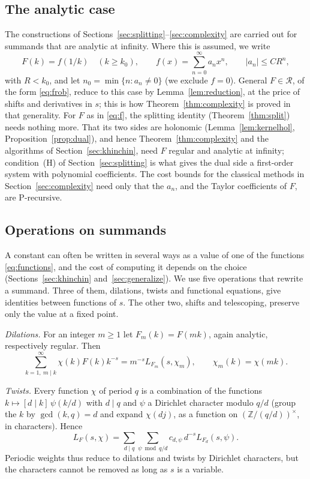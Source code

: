 \documentclass[11pt,reqno]{amsart}
\theoremstyle{definition}
\theoremstyle{remark}
\newcommand{\Reg}{\mathcal{R}}
\newcommand{\ZZ}{\mathbb{Z}}
\begin{document}
\subsection{The analytic case}\label{sec:scope}
The constructions of Sections~\ref{sec:splitting}--\ref{sec:complexity} are carried out for summands that are
analytic at infinity. Where this is assumed, we write
\begin{equation}\label{eq:f}
  F(k) = f(1/k) \quad (k \ge k_0), \qquad f(x) = \sum_{n=0}^{\infty}a_nx^n, \qquad |a_n| \le C R^n,
\end{equation}
with $R < k_0$, and let $n_0 = \min\{n : a_n \ne 0\}$ (we exclude $f = 0$). General $F \in \Reg$, of the form \eqref{eq:frob},
reduce to this case by Lemma~\ref{lem:reduction}, at the price of shifts and derivatives in $s$; this is how
Theorem~\ref{thm:complexity} is proved in that generality. For $F$ as in \eqref{eq:f}, the splitting identity
(Theorem~\ref{thm:split}) needs nothing more. That its two sides are holonomic (Lemma~\ref{lem:kernelhol}, Proposition~\ref{prop:dual}), and hence
Theorem~\ref{thm:complexity} and the algorithms of Section~\ref{sec:khinchin}, need $F$ regular and analytic at
infinity; condition~(H) of Section~\ref{sec:splitting} is what gives the dual side a first-order system with
polynomial coefficients. The cost bounds for the classical methods in Section~\ref{sec:complexity} need only that
the $a_n$, and the Taylor coefficients of $F$, are P-recursive.

\subsection{Operations on summands}\label{sec:twists}
A constant can often be written in several ways as a value of one of the functions \eqref{eq:functions}, and the
cost of computing it depends on the choice (Sections~\ref{sec:khinchin} and~\ref{sec:generalize}). We use five
operations that rewrite a summand. Three of them, dilations, twists and functional equations, give identities between
functions of $s$. The other two, shifts and telescoping, preserve only the value at a fixed point.

\emph{Dilations.} For an integer $m \ge 1$ let $F_m(k) = F(mk)$, again analytic, respectively regular. Then
\[
  \sum_{k=1,\ m\mid k}^{\infty}\chi(k)F(k)k^{-s} = m^{-s}L_{F_m}(s,\chi_m), \qquad \chi_m(k) = \chi(mk).
\]

\emph{Twists.} Every function $\chi$ of period $q$ is a combination of the functions $k \mapsto [d \mid k]\,\psi(k/d)$
with $d \mid q$ and $\psi$ a Dirichlet character modulo $q/d$ (group the $k$ by $\gcd(k,q) = d$ and expand $\chi(dj)$,
as a function on $(\ZZ/(q/d))^\times$, in characters). Hence
\[
  L_F(s,\chi) = \sum_{d\mid q}\sum_{\psi \bmod q/d}c_{d,\psi}\,d^{-s}L_{F_d}(s,\psi).
\]
Periodic weights thus reduce to dilations and twists by Dirichlet characters, but the characters cannot be removed
as long as $s$ is a variable.
\end{document}
